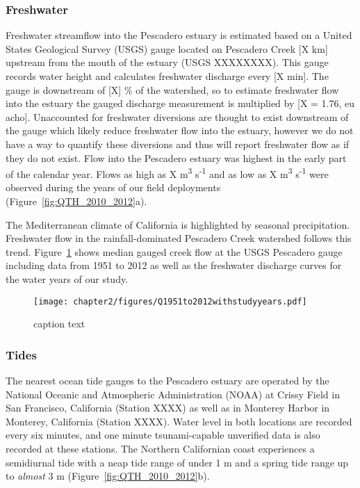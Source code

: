 \subsubsection{Freshwater}
Freshwater streamflow into the Pescadero estuary is
estimated based on a United States Geological Survey (USGS) gauge
located on Pescadero Creek [X km] upstream from the mouth of the estuary
(USGS XXXXXXXX). This gauge records water height and calculates
freshwater discharge every [X min]. The gauge is downstream of [X] \% of
the watershed, so to estimate freshwater flow into the estuary the
gauged discharge measurement is multiplied by [X = 1.76, eu acho].
Unaccounted for freshwater diversions are thought to exist downstream of
the gauge which likely reduce freshwater flow into the estuary, however
we do not have a way to quantify these diversions and thus will report
freshwater flow as if they do not exist. Flow into the Pescadero estuary was highest in the early part of the calendar year. Flows as high as X m\textsuperscript{3} s\textsuperscript{-1} and as low as X m\textsuperscript{3} s\textsuperscript{-1} were observed during the years of our field deployments (Figure~\ref{fig:QTH_2010_2012}a).

The Mediterranean climate of California is highlighted by seasonal
precipitation. Freshwater flow in the rainfall-dominated Pescadero Creek watershed follows this trend. Figure~\ref{fig:Q_1951_2012} shows median gauged creek flow at the USGS Pescadero gauge including data from 1951 to 2012 as well as the freshwater discharge curves for the water years of our study. 


\begin{figure}
\texttt{[image: chapter2/figures/Q1951to2012withstudyyears.pdf]} 
\caption{ caption text }\label{fig:Q_1951_2012} \end{figure}


\subsubsection{Tides}
The nearest ocean tide gauges to the Pescadero estuary are
operated by the National Oceanic and Atmospheric Administration (NOAA)
at Crissy Field in San Francisco, California (Station XXXX) as well as
in Monterey Harbor in Monterey, California (Station XXXX). Water
level in both locations are recorded every six minutes, and one minute
tsunami-capable unverified data is also recorded at these stations. The Northern Californian coast experiences a semidiurnal tide with a neap tide range of under 1 m and a spring tide range up to \emph{almost} 3 m (Figure~\ref{fig:QTH_2010_2012}b).


